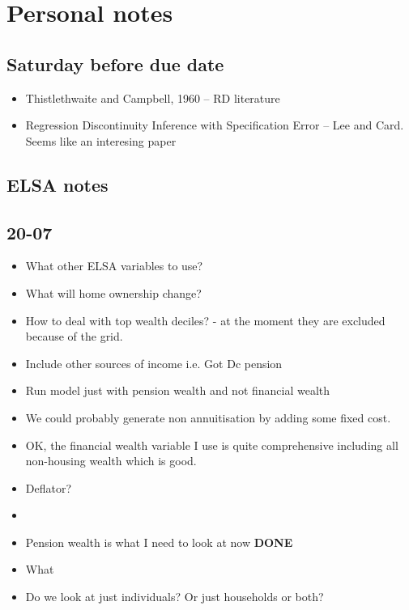 \documentclass[12pt]{article}
\begin{document}
\section{Personal notes}

\subsection{Saturday before due date}
\begin{itemize}
    \item Thistlethwaite and Campbell, 1960 -- RD literature
    \item Regression Discontinuity Inference with Specification Error -- Lee and Card. Seems like an interesing paper
\end{itemize}

\subsection{ELSA notes}
\subsection{\textbf{20-07}}
\begin{itemize}
    \item What other ELSA variables to use?
    \item What will home ownership change?
    \item How to deal with top wealth deciles? - at the moment they are excluded because of the grid.
    \item Include other sources of income i.e. Got Dc pension
    \item Run model just with pension wealth and not financial wealth
    \item We could probably generate non annuitisation by adding some fixed cost.
    \item OK, the financial wealth variable I use is quite comprehensive including all non-housing
          wealth which is good.
    \item Deflator?
    \item

    \item Pension wealth is what I need to look at now \textbf{DONE}
    \item What
    \item Do we look at just individuals? Or just households or both?
\end{itemize}
\end{document}
